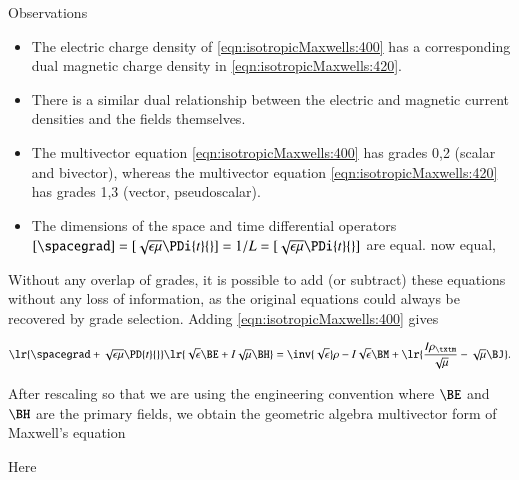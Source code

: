 Observations
\begin{itemize}
\item
The electric charge density of \cref{eqn:isotropicMaxwells:400} has a corresponding dual magnetic charge density in \cref{eqn:isotropicMaxwells:420}.
\item
There is a similar dual relationship between the electric and magnetic current densities and the fields themselves.
\item
The multivector equation \cref{eqn:isotropicMaxwells:400} has grades 0,2 (scalar and bivector), whereas the multivector equation \cref{eqn:isotropicMaxwells:420} has grades 1,3 (vector, pseudoscalar).
\item
The
dimensions of the space and time differential operators \( [\spacegrad] = [\sqrt{\epsilon\mu} \PDi{t}{}] = 1/L = [\sqrt{\epsilon\mu}\PDi{t}{}]\) are equal.
now equal,
\end{itemize}

Without any overlap of grades, it is possible to add (or subtract) these equations without any loss of information, as
the original equations could always be recovered by grade selection.
Adding \cref{eqn:isotropicMaxwells:400} gives

\begin{dmath}\label{eqn:isotropicMaxwells:440}
\lr{ \spacegrad + \sqrt{\epsilon\mu} \PD{t}{} }
\lr{ \sqrt{\epsilon} \BE
+
I \sqrt{\mu} \BH
}
=
\inv{\sqrt{\epsilon}} \rho
- I \sqrt{\epsilon} \BM
+\lr{
\frac{I \rho_\txtm}{\sqrt{\mu}}
- \sqrt{\mu} \BJ
}
.
\end{dmath}

After rescaling so that we are using
the engineering convention where \( \BE \) and \( \BH \) are the primary fields, we obtain the geometric algebra multivector form of Maxwell's equation


Here

